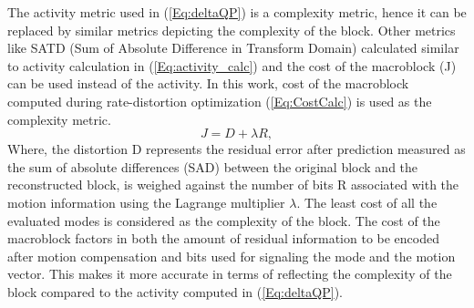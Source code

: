 \documentclass[11pt]{article} %
\begin{document}
The activity metric used in (\ref{Eq:deltaQP}) is a complexity metric, hence it can be replaced by similar metrics depicting the complexity of the block. Other metrics like SATD (Sum of Absolute Difference in Transform Domain) calculated similar to activity calculation in (\ref{Eq:activity_calc}) and the cost of the macroblock (J) can be used instead of the activity. In this work, cost of the macroblock computed during rate-distortion optimization (\ref{Eq:CostCalc}) is used as the complexity metric. 
 \begin{equation}
	\label{Eq:CostCalc}
		J = D + \lambda R,
\end{equation}
Where, the distortion D represents the residual error after prediction measured as the sum of absolute differences (SAD) between the original block and the reconstructed block, is weighed against the number of bits R associated with the motion information using the Lagrange multiplier $\lambda$. The least cost of all the evaluated modes is considered as the complexity of the block. The cost of the macroblock factors in both the amount of residual information to be encoded after motion compensation and bits used for signaling the mode and the motion vector. This makes it more accurate in terms of reflecting the complexity of the block compared to the activity computed in (\ref{Eq:deltaQP}).
\end{document}
